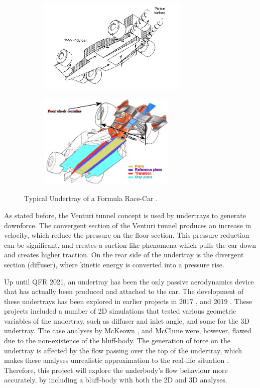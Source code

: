 \begin{figure}[!ht]
\begin{center}
%    
  \begin{subfigure}[b]{0.4\textwidth}
    \includegraphics[height=4.5cm]{Figures/underbody.PNG}
  \end{subfigure}
  \begin{subfigure}[b]{0.4\textwidth}
    \includegraphics[height=4.5cm]{Figures/undertray_f1.png}
  \end{subfigure}
%  
  \caption{Typical Undertray of a Formula Race-Car \cite{Katz1995RaceSpeed}\cite{AnonymousUndertrayUnderbody}.}
    \label{fig:underbody}
\end{center}
\end{figure}

\noindent As stated before, the Venturi tunnel concept is used by undertrays to generate downforce. The convergent section of the Venturi tunnel produces an increase in velocity, which reduce the pressure on the floor section. This pressure reduction can be significant, and creates a suction-like phenomena which pulls the car down and creates higher traction. On the rear side of the undertray is the divergent section (diffuser), where kinetic energy is converted into a pressure rise. 

\noindent Up until QFR 2021, an undertray has been the only passive aerodynamics device that has actually been produced and attached to the car. The development of these undertrays has been explored in earlier projects in 2017 \cite{McKeown2018DesignCar}, and 2019 \cite{McClune2018DesignCar}. These projects included a number of 2D simulations that tested various geometric variables of the undertray, such as diffuser and inlet angle, and some for the 3D undertray. The case analyses by McKeown \cite{McKeown2018DesignCar}, and McClune \cite{McClune2018DesignCar} were, however, flawed due to the non-existence of the bluff-body. The generation of force on the undertray is affected by the flow passing over the top of the undertray, which makes these analyses unrealistic approximation to the real-life situation \cite{Corr2017MechanicalAuthor}. Therefore, this project will explore the underbody's flow behaviour more accurately, by including a bluff-body with both the 2D and 3D analyses.   

